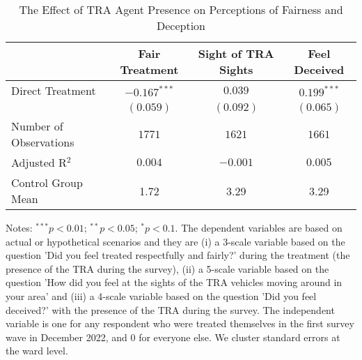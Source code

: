 
\begin{table}
\caption{The Effect of TRA Agent Presence on Perceptions of Fairness and Deception}
\begin{center}
\begin{threeparttable}
\begin{tabular}{l c c c}
\toprule
 & Fair Treatment & Sight of TRA Sights & Feel Deceived \\
\midrule
Direct Treatment       & $-0.167^{***}$ & $0.039$   & $0.199^{***}$ \\
                       & $(0.059)$      & $(0.092)$ & $(0.065)$     \\
\midrule
Number of Observations & $1771$         & $1621$    & $1661$        \\
Adjusted R$^2$         & $0.004$        & $-0.001$  & $0.005$       \\
Control Group Mean     & 1.72           & 3.29      & 3.29          \\
\bottomrule
\end{tabular}
\begin{tablenotes}[flushleft]
\scriptsize{Notes: $^{***}p<0.01$; $^{**}p<0.05$; $^{*}p<0.1$. The dependent variables are based on actual or hypothetical scenarios and they are (i) a 3-scale variable based on the question 'Did you feel treated respectfully and fairly?' during the treatment (the presence of the TRA during the survey), (ii) a 5-scale variable based on the question 'How did you feel at the sights of the TRA vehicles moving around in your area' and (iii) a 4-scale variable based on the question 'Did you feel deceived?' with the presence of the TRA during the survey. The independent variable is one for any respondent who were treated themselves in the first survey wave in December 2022, and 0 for everyone else. We cluster standard errors at the ward level.}
\end{tablenotes}
\end{threeparttable}
\label{table:coefficients}
\end{center}
\end{table}
